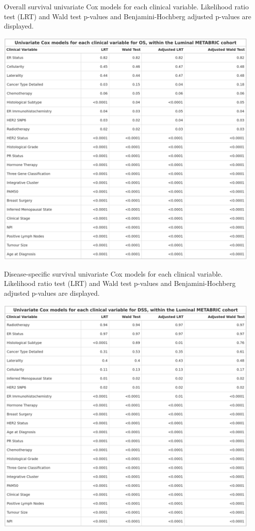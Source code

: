 \vfill
\begin{table}[!h]
\caption[Overall survival univariate Cox models for each clinical variable.]{Overall survival univariate Cox models for each clinical variable. Likelihood ratio test (LRT) and Wald test p-values and Benjamini-Hochberg adjusted p-values are displayed.}
\includegraphics[width=0.98\textwidth]{../tables/Chapter_3/Luminal_Survival_Association_OS.png}
\label{tab:Surv_Tests_OS}
\end{table}
\vfill
\clearpage
\begin{table}[!ht]
\caption[Disease-specific survival univariate Cox models for each clinical variable.]{Disease-specific survival univariate Cox models for each clinical variable. Likelihood ratio test (LRT) and Wald test p-values and Benjamini-Hochberg adjusted p-values are displayed.}
\includegraphics[width=0.98\textwidth]{../tables/Chapter_3/Luminal_Survival_Association_DSS.png}
\label{tab:Surv_Tests_DSS}
\end{table}

